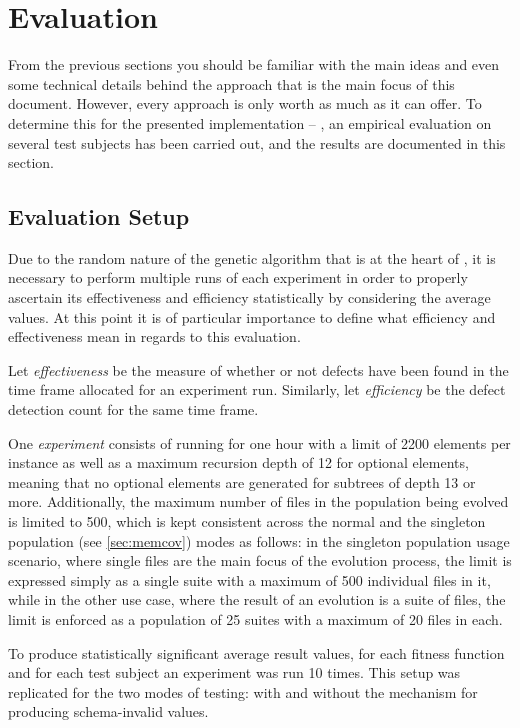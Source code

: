 \section{Evaluation}
\label{sec:evaluation}
From the previous sections you should be familiar with the main ideas and even some technical details behind
the approach that is the main focus of this document. However, every approach is only worth as much as it can
offer. To determine this for the presented implementation -- \xmlmate, an empirical evaluation on several test
subjects has been carried out, and the results are documented in this section.
\subsection{Evaluation Setup}

Due to the random nature of the genetic algorithm that is at the heart of \xmlmate, it is necessary to perform
multiple runs of each experiment in order to properly ascertain its effectiveness and efficiency statistically
by considering the average values. At this point it is of particular importance to define what efficiency and
effectiveness mean in regards to this evaluation. 

Let \emph{effectiveness} be the measure of whether or not defects have been found in the time frame allocated
for an experiment run. Similarly, let \emph{efficiency} be the defect detection count for the same time frame.

One \emph{experiment} consists of running \xmlmate for one hour with a limit of 2200 elements per \xml instance
as well as a maximum recursion depth of 12 for optional elements, meaning that no optional elements are generated
for subtrees of depth 13 or more. Additionally, the maximum number of \xml files in the population being
evolved is limited to 500, which is kept consistent across the normal and the singleton population (see
\cref{sec:memcov}) modes as follows: in the singleton population usage scenario, where single files are the
main focus of the evolution process, the limit is expressed simply as a single suite with a maximum of 500
individual files in it, while in the other use case, where the result of an evolution is a suite of files, the
limit is enforced as a population of 25 suites with a maximum of 20 files in each.

To produce statistically significant average result values, for each fitness function and for each test
subject an experiment was run 10 times. This setup was replicated for the two modes of testing: with and
without the mechanism for producing schema-invalid values.

